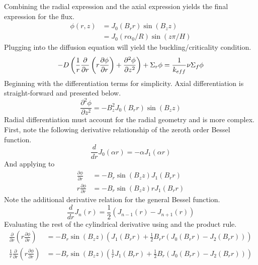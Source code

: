   Combining the radial expression  and the axial 
  expression  yields the final expression for the flux.
  \begin{align} \label{eq:analytic_finite_cyl}
    \phi(r,z) &= J_0(B_r r) \sin(B_z z) \\
    &= J_0(r \alpha_0 / R) \sin(z \pi / H)
  \end{align}
  Plugging  into the diffusion equation will yield the 
  buckling/criticality condition.
  \begin{equation}
    -D \left( \frac{1}{r} \frac{\partial}{\partial r} \left( r 
      \frac{\partial \phi}{\partial r} \right) + \frac{\partial^2 \phi}
      {\partial z^2} \right) + \Sigma_r \phi = \frac{1}{k_{eff}} \nu 
      \Sigma_f \phi
  \end{equation}
  Beginning with the differentiation terms for simplicity. Axial 
  differentiation is straight-forward and presented below.
  \begin{equation}
    \label{eq:above}
    \frac{\partial^2 \phi}{\partial z^2} = -B_z^2 J_0(B_r r) \sin(B_z z)
  \end{equation}
  Radial differentiation must account for the radial geometry and is more 
  complex. First, note the following derivative relationship of the zeroth
  order Bessel function.
  \begin{equation} \label{eq:deriv_bessel0}
    \frac{d}{dr} J_0(\alpha r) = - \alpha J_1(\alpha r)
  \end{equation}
  And applying  to 
  \begin{align}
    \frac{\partial \phi}{\partial r} &= -B_r \sin(B_z z) J_1(B_r r) \\
    r \frac{\partial \phi}{\partial r} &= -B_r \sin(B_z z) r J_1 (B_r r) 
  \end{align}
  Note the additional derivative relation for the general Bessel function.
  \begin{equation} \label{eq:deriv_besseln}
    \frac{d}{dr} J_n(r) = \frac{1}{2} \left( J_{n-1}(r) - J_{n+1}(r)\right)
  \end{equation}
  Evaluating the rest of the cylindrical derivative using
   and the product rule.
  \begin{align}
    \frac{\partial}{\partial r} \left( r \frac{\partial \phi}{\partial r}
      \right) &= -B_r \sin(B_z z) \left(J_1(B_r r) + \frac{1}{2} B_r r \left(
      J_0(B_r r) - J_2(B_r r) \right) \right) \\
    \frac{1}{r} \frac{\partial}{\partial r} \left(r 
      \frac{\partial \phi}{\partial r} \right) &=
      -B_r \sin(B_z z) \left(\frac{1}{r} J_1(B_r r) + \frac{1}{2} B_r \left(
      J_0(B_r r) - J_2(B_r r) \right) \right)
  \end{align}
